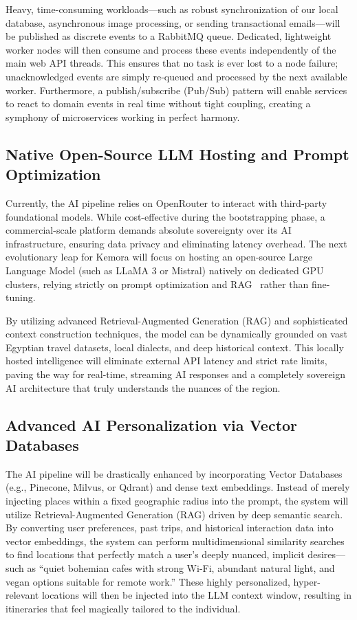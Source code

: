 Heavy, time-consuming workloads---such as robust synchronization of our local database, asynchronous image processing, or sending transactional emails---will be published as discrete events to a RabbitMQ queue. Dedicated, lightweight worker nodes will then consume and process these events independently of the main web API threads. This ensures that no task is ever lost to a node failure; unacknowledged events are simply re-queued and processed by the next available worker. Furthermore, a publish/subscribe (Pub/Sub) pattern will enable services to react to domain events in real time without tight coupling, creating a symphony of microservices working in perfect harmony.

\subsection{Native Open-Source LLM Hosting and Prompt Optimization}
Currently, the AI pipeline relies on OpenRouter to interact with third-party foundational models. While cost-effective during the bootstrapping phase, a commercial-scale platform demands absolute sovereignty over its AI infrastructure, ensuring data privacy and eliminating latency overhead. The next evolutionary leap for Kemora will focus on hosting an open-source Large Language Model (such as LLaMA 3 or Mistral) natively on dedicated GPU clusters, relying strictly on prompt optimization and RAG~\cite{lewis2020retrieval} rather than fine-tuning.

By utilizing advanced Retrieval-Augmented Generation (RAG) and sophisticated context construction techniques, the model can be dynamically grounded on vast Egyptian travel datasets, local dialects, and deep historical context. This locally hosted intelligence will eliminate external API latency and strict rate limits, paving the way for real-time, streaming AI responses and a completely sovereign AI architecture that truly understands the nuances of the region.

\subsection{Advanced AI Personalization via Vector Databases}
The AI pipeline will be drastically enhanced by incorporating Vector Databases (e.g., Pinecone, Milvus, or Qdrant) and dense text embeddings. Instead of merely injecting places within a fixed geographic radius into the prompt, the system will utilize Retrieval-Augmented Generation (RAG) driven by deep semantic search. By converting user preferences, past trips, and historical interaction data into vector embeddings, the system can perform multidimensional similarity searches to find locations that perfectly match a user's deeply nuanced, implicit desires---such as ``quiet bohemian cafes with strong Wi-Fi, abundant natural light, and vegan options suitable for remote work.'' These highly personalized, hyper-relevant locations will then be injected into the LLM context window, resulting in itineraries that feel magically tailored to the individual.

